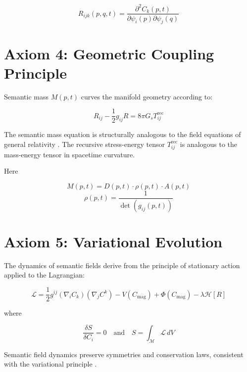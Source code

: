 \begin{equation}
R_{ijk}(p,q,t) = \frac{\partial^2 C_k(p,t)}{\partial \psi_i(p) \partial \psi_j(q)}
\end{equation}

\section{Axiom 4: Geometric Coupling Principle}

Semantic mass \(M(p,t)\) curves the manifold geometry according to:

\begin{equation}
R_{ij} - \frac{1}{2}g_{ij}R = 8\pi G_s T^{\text{rec}}_{ij}
\end{equation}

The semantic mass equation is structurally analogous to the field equations of general relativity \autocite{Einstein1915, MisnerThorneWheeler1973, Wald1984}. The recursive stress-energy tensor \(T^{\text{rec}}_{ij}\) is analogous to the mass-energy tensor in spacetime curvature.

Here

\begin{equation}
M(p,t) = D(p,t) \cdot \rho(p,t) \cdot A(p,t)
\end{equation}
\begin{equation}
\rho(p,t) = \frac{1}{\det(g_{ij}(p,t))}
\end{equation}

\section{Axiom 5: Variational Evolution}

The dynamics of semantic fields derive from the principle of stationary action applied to the Lagrangian:

\begin{equation}
\mathcal{L} = \frac{1}{2} g^{ij} (\nabla_i C_k)(\nabla_j C^k) - V(C_{\text{mag}}) + \Phi(C_{\text{mag}}) - \lambda \mathcal{H}[R]
\end{equation}

where

\begin{equation}
\frac{\delta S}{\delta C_i} = 0 \quad \text{and} \quad S = \int_{\mathcal{M}} \mathcal{L} \, dV
\end{equation}

Semantic field dynamics preserve symmetries and conservation laws, consistent with the variational principle \autocite{GoldsteinPooleSafko2002, Arnold1989}.

